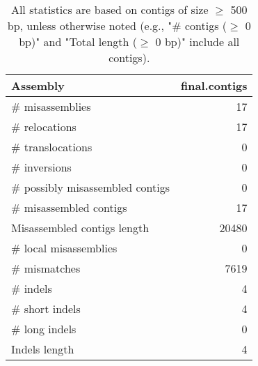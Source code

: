 \documentclass[12pt,a4paper]{article}
\begin{document}
\begin{table}[ht]
\begin{center}
\caption{All statistics are based on contigs of size $\geq$ 500 bp, unless otherwise noted (e.g., "\# contigs ($\geq$ 0 bp)" and "Total length ($\geq$ 0 bp)" include all contigs).}
\begin{tabular}{|l*{1}{|r}|}
\hline
Assembly & final.contigs \\ \hline
\# misassemblies & 17 \\ \hline
\hspace{5mm}\# relocations & 17 \\ \hline
\hspace{5mm}\# translocations & 0 \\ \hline
\hspace{5mm}\# inversions & 0 \\ \hline
\# possibly misassembled contigs & 0 \\ \hline
\# misassembled contigs & 17 \\ \hline
Misassembled contigs length & 20480 \\ \hline
\# local misassemblies & 0 \\ \hline
\# mismatches & 7619 \\ \hline
\# indels & 4 \\ \hline
\hspace{5mm}\# short indels & 4 \\ \hline
\hspace{5mm}\# long indels & 0 \\ \hline
Indels length & 4 \\ \hline
\end{tabular}
\end{center}
\end{table}
\end{document}

